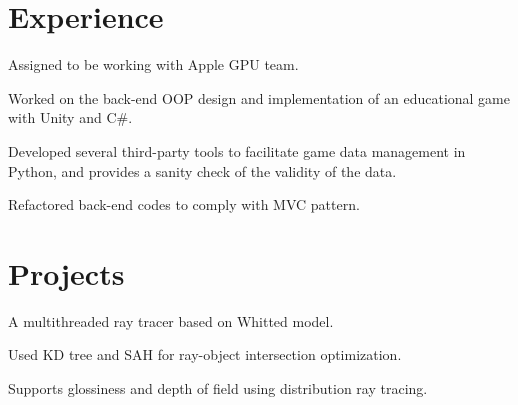 \documentclass[]{deedy-resume-openfont}
\begin{document}
\hfill
\begin{minipage}[t]{0.66\textwidth} 


\section{Experience}

\vspace{\topsep} %
\begin{tightemize} 
\item Assigned to be working with Apple GPU team.
\end{tightemize}
\sectionsep

\begin{tightemize} 
\item Worked on the back-end OOP design and implementation of an educational game with Unity and C\#.
\item Developed several third-party tools to facilitate game data management in Python, and provides a sanity check of the validity of the data.
\item Refactored back-end codes to comply with MVC pattern.
\end{tightemize}
\sectionsep



\section{Projects}

\begin{tightemize} 
\item A multithreaded ray tracer based on Whitted model.
\item Used KD tree and SAH for ray-object intersection optimization.
\item Supports glossiness and depth of field using distribution ray tracing.
\end{tightemize}
\sectionsep


\end{minipage}
\end{document}
